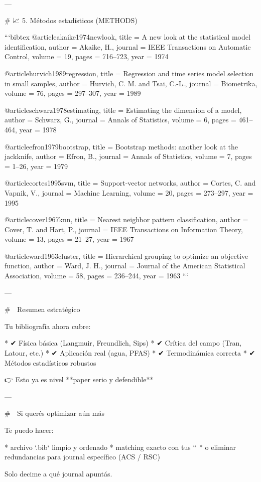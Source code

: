 ---

# 📈 5. Métodos estadísticos (METHODS)

```bibtex
@article{akaike1974newlook,
	title = {A new look at the statistical model identification},
	author = {Akaike, H.},
	journal = {IEEE Transactions on Automatic Control},
	volume = {19},
	pages = {716--723},
	year = {1974}
}

@article{hurvich1989regression,
	title = {Regression and time series model selection in small samples},
	author = {Hurvich, C. M. and Tsai, C.-L.},
	journal = {Biometrika},
	volume = {76},
	pages = {297--307},
	year = {1989}
}

@article{schwarz1978estimating,
	title = {Estimating the dimension of a model},
	author = {Schwarz, G.},
	journal = {Annals of Statistics},
	volume = {6},
	pages = {461--464},
	year = {1978}
}

@article{efron1979bootstrap,
	title = {Bootstrap methods: another look at the jackknife},
	author = {Efron, B.},
	journal = {Annals of Statistics},
	volume = {7},
	pages = {1--26},
	year = {1979}
}

@article{cortes1995svm,
	title = {Support-vector networks},
	author = {Cortes, C. and Vapnik, V.},
	journal = {Machine Learning},
	volume = {20},
	pages = {273--297},
	year = {1995}
}

@article{cover1967knn,
	title = {Nearest neighbor pattern classification},
	author = {Cover, T. and Hart, P.},
	journal = {IEEE Transactions on Information Theory},
	volume = {13},
	pages = {21--27},
	year = {1967}
}

@article{ward1963cluster,
	title = {Hierarchical grouping to optimize an objective function},
	author = {Ward, J. H.},
	journal = {Journal of the American Statistical Association},
	volume = {58},
	pages = {236--244},
	year = {1963}
}
```

---

# 🧠 Resumen estratégico

Tu bibliografía ahora cubre:

* ✔ Física básica (Langmuir, Freundlich, Sips)
* ✔ Crítica del campo (Tran, Latour, etc.)
* ✔ Aplicación real (agua, PFAS)
* ✔ Termodinámica correcta
* ✔ Métodos estadísticos robustos

👉 Esto ya es nivel **paper serio y defendible**

---

# 🚀 Si querés optimizar aún más

Te puedo hacer:

* archivo `.bib` limpio y ordenado
* matching exacto con tus `\cite{}`
* o eliminar redundancias para journal específico (ACS / RSC)

Solo decime a qué journal apuntás.
